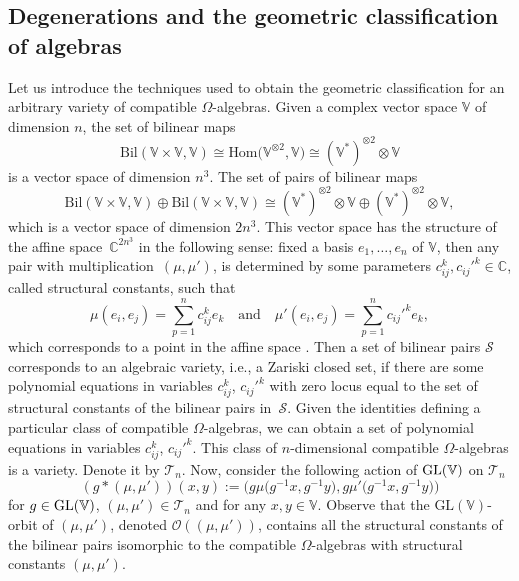 \documentclass[10pt,a4paper]{amsart}
\numberwithin{equation}{section}
\begin{document}
 \subsection{Degenerations and the geometric classification of algebras}
Let us introduce the techniques used to obtain the geometric classification for an arbitrary variety of compatible $\Omega$-algebras. Given a complex vector space ${\mathbb V}$ of dimension $n$, the set of bilinear maps
\[
\textrm{Bil}({\mathbb V} \times {\mathbb V}, {\mathbb V}) \cong \textrm{Hom}\bigl({\mathbb V} ^{\otimes2}, {\mathbb V}\bigr)\cong ({\mathbb V}^*)^{\otimes2} \otimes {\mathbb V}
\]
 is a vector space of dimension $n^3$. The set of pairs of bilinear maps %
\[
\textrm{Bil}({\mathbb V} \times {\mathbb V}, {\mathbb V}) \oplus \textrm{Bil}({\mathbb V}\times {\mathbb V}, {\mathbb V}) \cong ({\mathbb V}^*)^{\otimes2} \otimes {\mathbb V} \oplus ({\mathbb V}^*)^{\otimes2} \otimes {\mathbb V},
\]
 which is a vector space of dimension $2n^3$. This vector space has the structure of the affine space~$\mathbb{C}^{2n^3}$ in the following sense:
fixed a basis $e_1, \ldots, e_n$ of ${\mathbb V}$, then any pair with multiplication~$(\mu, \mu')$, is
determined by some parameters $c_{ij}^k, c_{ij}'^k \in \mathbb{C}$, called {structural constants}, such that
\[
\mu(e_i, e_j) = \sum_{p=1}^n c_{ij}^k e_k \quad \textrm{and}\quad \mu'(e_i, e_j) = \sum_{p=1}^n c_{ij}'^k e_k,
\]
which corresponds to a point in the affine space . Then a set of bilinear %
pairs $\mathcal S$ corresponds to an algebraic variety, i.e., a Zariski closed set, if there are some polynomial equations in variables $c_{ij}^k$, $c_{ij}'^k$ with zero locus equal to the set of structural constants of the bilinear pairs in~$\mathcal S$. Given the identities defining a particular class of compatible $\Omega$-algebras, we can obtain a set of polynomial equations in variables $c_{ij}^k$, $c_{ij}'^k$. This class of $n$-dimensional compatible $\Omega$-algebras is a variety. Denote it by $\mathcal{T}_{n}$. %
Now, consider the following action of $\rm{GL}({\mathbb V})$ on ${\mathcal T}_{n}$
\[
(g*(\mu, \mu'))(x,y) := \bigl(g \mu \bigl(g^{-1} x, g^{-1} y\bigr), g \mu' \bigl(g^{-1} x, g^{-1} y\bigr)\bigr)
\]
for $g\in\rm{GL}({\mathbb V})$, $(\mu, \mu')\in \mathcal{T}_{n}$ and for any $x, y \in {\mathbb V}$. Observe that the $\textrm{GL}({\mathbb V})$-orbit of $(\mu, \mu')$, denoted ${\mathcal O}((\mu, \mu'))$, contains all the structural constants of the bilinear pairs isomorphic to the compatible $\Omega$-algebras with structural constants $(\mu, \mu')$.
\end{document}
